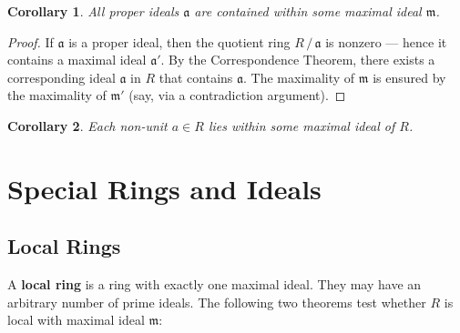 \documentclass[11pt]{article}
\newtheorem{corollary}{Corollary}
\begin{document}
\begin{adjustwidth}{0.5cm}{}
	\begin{corollary}
		All proper ideals $\mathfrak{a}$ are contained within some maximal ideal $\mathfrak{m}$.
	\end{corollary}
	\begin{proof}
		If $\mathfrak{a}$ is a proper ideal, then the quotient ring $R \,/\, \mathfrak{a}$ is nonzero --- hence it contains a maximal ideal $\mathfrak{a}'$. By the Correspondence Theorem, there exists a corresponding ideal $\mathfrak{a}$ in $R$ that contains $\mathfrak{a}$. The maximality of $\mathfrak{m}$ is ensured by the maximality of $\mathfrak{m}'$ (say, via a contradiction argument).
	\end{proof}
	\begin{corollary}
		Each non-unit $a \in R$ lies within some maximal ideal of $R$.
	\end{corollary}
\end{adjustwidth}


\section{Special Rings and Ideals}


\subsection{Local Rings}

A \textbf{local ring} is a ring with exactly one maximal ideal. They may have an arbitrary number of prime ideals. The following two theorems test whether $R$ is local with maximal ideal $\mathfrak{m}$:
\end{document}
